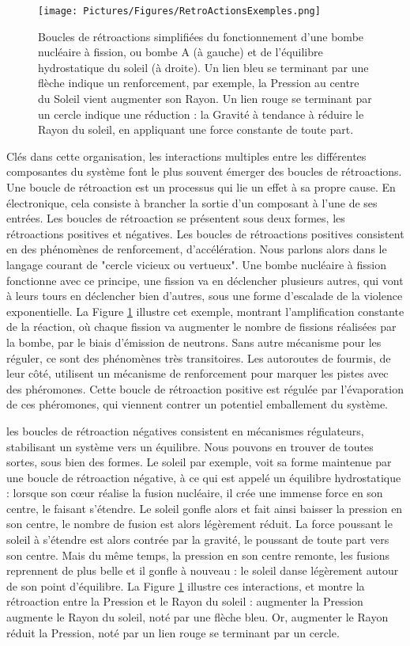 			\begin{figure}
			\centering
			\texttt{[image: Pictures/Figures/RetroActionsExemples.png]}
			\caption{Boucles de rétroactions simplifiées du fonctionnement d'une bombe nucléaire à fission, ou bombe A (à gauche) et de l'équilibre hydrostatique du soleil (à droite). Un lien bleu se terminant par une flèche indique un renforcement, par exemple, la Pression au centre du Soleil vient augmenter son Rayon. Un lien rouge se terminant par un cercle indique une réduction : la Gravité à tendance à réduire le Rayon du soleil, en appliquant une force constante de toute part.}
			\label{retroActions}
			\end{figure}
		
		Clés dans cette organisation, les interactions multiples entre les différentes composantes du système font le plus souvent émerger des boucles de rétroactions. Une boucle de rétroaction est un processus qui lie un effet à sa propre cause. En électronique, cela consiste à brancher la sortie d'un composant à l'une de ses entrées. Les boucles de rétroaction se présentent sous deux formes, les rétroactions positives et négatives. Les boucles de rétroactions positives consistent en des phénomènes de renforcement, d'accélération. Nous parlons alors dans le langage courant de "cercle vicieux ou vertueux". Une bombe nucléaire à fission fonctionne avec ce principe, une fission va en déclencher plusieurs autres, qui vont à leurs tours en déclencher bien d'autres, sous une forme d'escalade de la violence exponentielle. La Figure \ref{retroActions} illustre cet exemple, montrant l'amplification constante de la réaction, où chaque fission va augmenter le nombre de fissions réalisées par la bombe, par le biais d'émission de neutrons. Sans autre mécanisme pour les réguler, ce sont des phénomènes très transitoires. Les autoroutes de fourmis, de leur côté, utilisent un mécanisme de renforcement pour marquer les pistes avec des phéromones. Cette boucle de rétroaction positive est régulée par l'évaporation de ces phéromones, qui viennent contrer un potentiel emballement du système. 
		
		les boucles de rétroaction négatives consistent en mécanismes régulateurs, stabilisant un système vers un équilibre. Nous pouvons en trouver de toutes sortes, sous bien des formes. Le soleil par exemple, voit sa forme maintenue par une boucle de rétroaction négative, à ce qui est appelé un équilibre hydrostatique \cite{haubold_analytic_1992} : lorsque son cœur réalise la fusion nucléaire, il crée une immense force en son centre, le faisant s'étendre. Le soleil gonfle alors et fait ainsi baisser la pression en son centre, le nombre de fusion est alors légèrement réduit. La force poussant le soleil à s'étendre est alors contrée par la gravité, le poussant de toute part vers son centre. Mais du même temps, la pression en son centre remonte, les fusions reprennent de plus belle et il gonfle à nouveau : le soleil danse légèrement autour de son point d'équilibre. La Figure \ref{retroActions} illustre ces interactions, et montre la rétroaction entre la Pression et le Rayon du soleil : augmenter la Pression augmente le Rayon du soleil, noté par une flèche bleu. Or, augmenter le Rayon réduit la Pression, noté par un lien rouge se terminant par un cercle.
			
